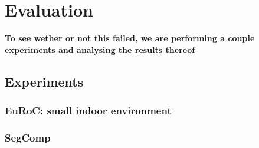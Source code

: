 \documentclass[main.tex]{subfiles}
\begin{document}
\chapter{Evaluation}

\textbf{To see wether or not this failed, we are performing a couple experiments and analysing the results thereof }

\section{Experiments}
\subsection{EuRoC: small indoor environment}
\subsection{SegComp}
\end{document}
